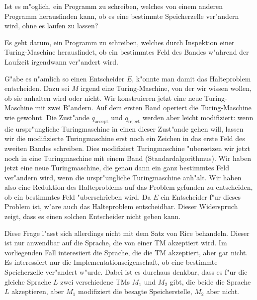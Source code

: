 Ist es m"oglich, ein Programm zu schreiben, welches von einem anderen
Programm herausfinden kann, ob es eine bestimmte Speicherzelle
ver"andern wird, ohne es laufen zu lassen?

\begin{loesung}
Es geht darum, ein Programm zu schreiben, welches durch Inspektion
einer Turing-Maschine herausfindet, ob ein bestimmtes Feld des
Bandes w"ahrend der Laufzeit irgendwann ver"andert wird.

G"abe es n"amlich so einen Entscheider $E$, k"onnte man damit das Halteproblem
entscheiden. Dazu sei $M$ irgend eine Turing-Maschine, von der wir
wissen wollen, ob sie anhalten wird oder nicht.
Wir konstruieren jetzt eine neue Turing-Maschine mit zwei
B"andern. Auf dem ersten Band operiert die Turing-Maschine
wie gewohnt.
Die Zust"ande $q_\text{accept}$ und $q_\text{reject}$ werden
aber leicht modifiziert: wenn die urspr"ungliche Turingmaschine 
in einen dieser Zust"ande gehen will, lassen wir die modifizierte
Turingmaschine erst noch ein Zeichen in das erste Feld des zweiten
Bandes schreiben. Dies modifiziert Turingmaschine "ubersetzen wir jetzt noch
in eine Turingmaschine mit einem Band (Standardalgorithmus). Wir haben
jetzt eine neue Turingmaschine, die genau dann ein ganz bestimmtes
Feld ver"andern wird, wenn die urspr"ungliche Turingmaschine
anh"alt. Wir haben also eine Reduktion des Halteproblems auf das
Problem gefunden zu entscheiden, ob ein bestimmtes Feld "uberschrieben
wird. Da $E$ ein Entscheider f"ur dieses Problem ist, w"are auch das
Halteproblem entscheidbar. Dieser Widerspruch zeigt, dass es einen
solchen Entscheider nicht geben kann.

Diese Frage l"asst sich allerdings nicht mit dem Satz von Rice 
behandeln. Dieser ist nur anwendbar auf die Sprache, die von einer
TM akzeptiert wird. Im vorliegenden Fall interesiiert die Sprache,
die die TM akzeptiert, aber gar nicht.
Es interessiert nur die Implementationseigenschaft, ob eine
bestimmte Speicherzelle ver"andert w"urde.
Dabei ist es durchaus denkbar, dass es f"ur die gleiche Sprache $L$
zwei verschiedene TMs $M_1$ und $M_2$ gibt, die beide die Sprache $L$
akzeptieren, aber $M_1$ modifiziert die besagte Speicherstelle, $M_2$
aber nicht.
\end{loesung}
